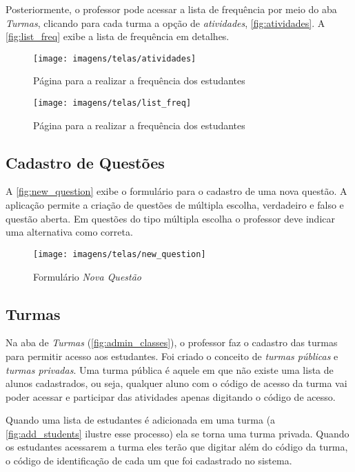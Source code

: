Posteriormente, o professor pode acessar a lista de frequência por meio do aba \textit{Turmas},
clicando para cada turma a opção de \textit{atividades}, \autoref{fig:atividades}. A \autoref{fig:list_freq} exibe a
lista de frequência em detalhes.

\begin{figure}[ht]
  \centering
  \caption{Página para a realizar a frequência dos estudantes}
  \texttt{[image: imagens/telas/atividades]}
  \doautor
  \label{fig:atividades}
\end{figure}

\begin{figure}[ht]
  \centering
  \caption{Página para a realizar a frequência dos estudantes}
  \texttt{[image: imagens/telas/list\_freq]}
  \doautor
  \label{fig:list_freq}
\end{figure}


\subsection{Cadastro de Questões}

A \autoref{fig:new_question} exibe o formulário para o cadastro de uma nova questão.
A aplicação permite a criação de questões de múltipla escolha, verdadeiro e falso e questão aberta.
Em questões do tipo múltipla escolha o professor deve indicar uma alternativa como correta.

\begin{figure}[ht]
  \centering
  \caption{Formulário \textit{Nova Questão}}
  \texttt{[image: imagens/telas/new\_question]}
  \doautor
  \label{fig:new_question}
\end{figure}

\subsection{Turmas}
\label{subsection:turmas}

Na aba de \textit{Turmas} (\autoref{fig:admin_classes}), o professor faz o cadastro das turmas
para permitir acesso aos estudantes. Foi criado o conceito de \textit{turmas públicas}
e \textit{turmas privadas}. Uma turma pública é aquele em que não existe uma
lista de alunos cadastrados, ou seja, qualquer aluno com o código de acesso da turma
vai poder acessar e participar das atividades apenas digitando o código de acesso.

Quando uma lista de estudantes é adicionada em uma turma (a \autoref{fig:add_students} ilustre esse processo) ela se
torna uma turma privada. Quando os estudantes acessarem a turma eles terão que
digitar além do código da turma, o código de identificação de cada um que foi cadastrado no sistema.

